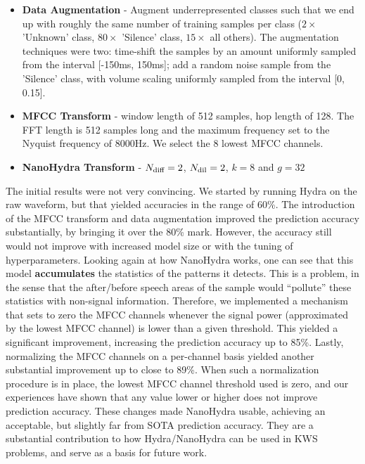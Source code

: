 \begin{itemize}
    \item \textbf{Data Augmentation} - Augment underrepresented classes such that we end up with roughly the same number of training 
                                       samples per class ($2\times$ 'Unknown' class, $80\times$ 'Silence' class, $15\times$ all others).
                                       The augmentation techniques were two: time-shift the samples by an amount uniformly sampled from the interval [-150ms, 150ms]; add a random noise sample from the 'Silence' class, with volume scaling uniformly sampled from the interval [0, 0.15].
    \item \textbf{MFCC Transform} - window length of 512 samples, hop length of 128. The FFT length is 512 samples long and the maximum frequency set to the Nyquist frequency of 8000Hz. We select the 8 lowest MFCC channels.
    \item \textbf{NanoHydra Transform} - $N\sb{\text{diff}} = 2$, $N\sb{\text{dil}} = 2$, $k=8$ and $g=32$
\end{itemize}
The initial results were not very convincing. We started by running Hydra on the raw waveform, but that yielded accuracies in the range of 60\%. The introduction of the MFCC transform and data augmentation improved the prediction
accuracy substantially, by bringing it over the 80\% mark. However, the accuracy still would not improve with increased model size or with the tuning of hyperparameters. Looking again at how NanoHydra works, one can
see that this model \textbf{accumulates} the statistics of the patterns it detects. This is a problem, in the sense that the after/before speech areas of the sample would ``pollute'' these statistics with non-signal information.
Therefore, we implemented a mechanism that sets to zero the MFCC channels whenever the signal power (approximated by the lowest MFCC channel) is lower than a given threshold. This yielded a significant improvement, increasing the
prediction accuracy up to 85\%. Lastly, normalizing the MFCC channels on a per-channel basis yielded another substantial improvement up to close to 89\%. When such a normalization procedure is in place, the lowest MFCC channel threshold
used is zero, and our experiences have shown that any value lower or higher does not improve prediction accuracy. These changes made NanoHydra usable, achieving an acceptable, but slightly far from SOTA prediction accuracy. They are a substantial
contribution to how Hydra/NanoHydra can be used in KWS problems, and serve as a basis for future work.


